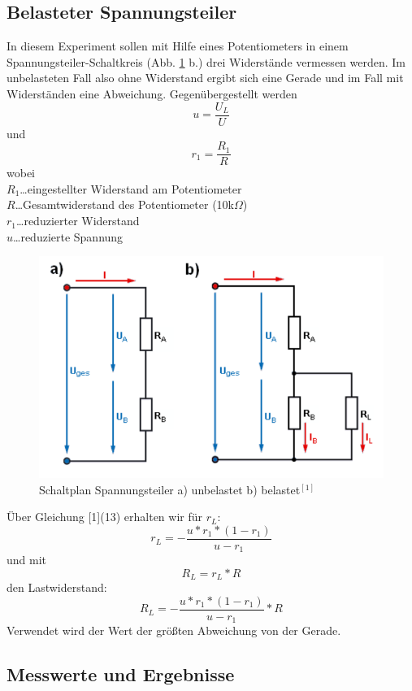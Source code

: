 \documentclass[12pt,a4paper]{article}
\begin{document}
\begin{multicols}{2}
\section{Belasteter Spannungsteiler}
In diesem Experiment sollen mit Hilfe eines Potentiometers in einem Spannungsteiler-Schaltkreis (Abb. \ref{fig:schaltbild_spannungsteiler} b.) drei Widerstände vermessen werden. Im unbelasteten Fall also ohne Widerstand ergibt sich eine Gerade und im Fall mit Widerständen eine Abweichung. Gegenübergestellt werden
$$u = \frac{U_L}{U}$$
und
$$r_1 = \frac{R_1}{R}$$
wobei\\
$R_1$\ldots eingestellter Widerstand am Potentiometer  \\
$R$\ldots Gesamtwiderstand des Potentiometer (10k$\Omega$)\\
$r_1$\ldots reduzierter Widerstand \\
$u$\ldots reduzierte Spannung
\begin{figure}[H]
	\centering
	\includegraphics[scale=0.3]{./figure/spannungsteiler_schaltplan.png}
	\caption{Schaltplan Spannungsteiler a) unbelastet b) belastet$^{[1]}$}
	\label{fig:schaltbild_spannungsteiler}
\end{figure}
\noindent
Über Gleichung [1](13) erhalten wir für $r_L$:
$$r_L = - \frac{u*r_1 * (1-r_1)}{u-r_1}$$
und mit 
$$R_L = r_L * R$$
den Lastwiderstand:\\
$$R_L = - \frac{u*r_1 * (1-r_1)}{u-r_1} * R$$
Verwendet wird der Wert der größten Abweichung von der Gerade.
\subsection{Messwerte und Ergebnisse}
\end{multicols}
\end{document}
